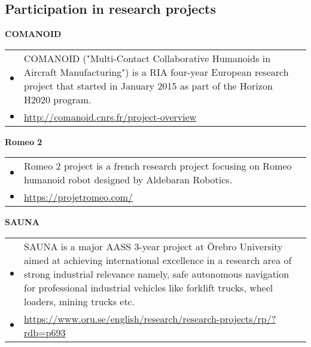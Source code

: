 \documentclass[a4paper,10pt]{report}
\begin{document}
\subsection{\hspace{0.5cm}Participation in research projects}
\begin{adjustwidth}{1.0cm}{0pt}
    {\bf {} COMANOID} \\
        \begin{tabularx}{\linewidth}{l X}
            \hfill $\bullet$    &   COMANOID ("Multi-Contact Collaborative
                                    Humanoids in Aircraft Manufacturing")
                                    is a RIA four-year European research
                                    project that started in January 2015
                                    as part of the Horizon H2020 program.\\
            \hfill $\bullet$    &   \url{http://comanoid.cnrs.fr/project-overview}
        \end{tabularx}
    \vspace{0.2cm}


    {\bf {} Romeo 2}\\
        \begin{tabularx}{\linewidth}{l X}
            \hfill $\bullet$    &   Romeo 2 project is a french research
                                    project focusing on Romeo humanoid
                                    robot designed by Aldebaran Robotics.\\
            \hfill $\bullet$    &   \url{https://projetromeo.com/}
        \end{tabularx}
    \vspace{0.2cm}


    {\bf {} SAUNA} \\
        \begin{tabularx}{\linewidth}{l X}
            \hfill $\bullet$    &   SAUNA is a major AASS 3-year project at
                                    \"Orebro University aimed at achieving
                                    international excellence in a research area of
                                    strong industrial relevance namely,
                                    safe autonomous navigation for
                                    professional industrial vehicles like
                                    forklift trucks, wheel loaders, mining
                                    trucks etc.\\
            \hfill $\bullet$    &   \url{https://www.oru.se/english/research/research-projects/rp/?rdb=p693}
        \end{tabularx}
\end{adjustwidth}
\end{document}
